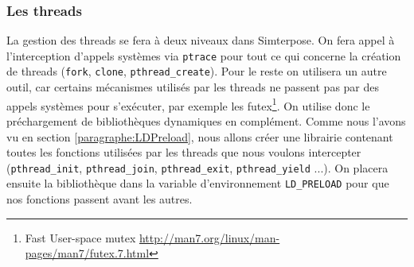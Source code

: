 \subsubsection{Les threads}
\label{section:threads}

La gestion des threads se fera à deux niveaux dans Simterpose. On fera appel à l'interception d'appels systèmes via \texttt{ptrace} pour tout ce qui concerne la création de threads (\texttt{fork}, \texttt{clone}, \texttt{pthread\_create}). Pour le reste on utilisera un autre outil, car certains mécanismes utilisés par les threads ne passent pas par des appels systèmes pour s'exécuter, par exemple les futex\footnote{Fast User-space mutex \url{http://man7.org/linux/man-pages/man7/futex.7.html}}. On utilise donc le préchargement de bibliothèques dynamiques en complément. Comme nous l'avons vu en section \ref{paragraphe:LDPreload}, nous allons créer une librairie contenant toutes les fonctions utilisées par les threads que nous voulons intercepter (\texttt{pthread\_init}, \texttt{pthread\_join}, \texttt{pthread\_exit}, \texttt{pthread\_yield} ...). On placera ensuite la bibliothèque dans la variable d'environnement \texttt{LD\_PRELOAD} pour que nos fonctions passent avant les autres.


